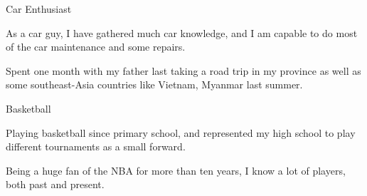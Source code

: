 
\begin{cventries}
  \cventry
    {} %
    {Car Enthusiast} %
    {} %
    {} %
    {
      \begin{cvitems} %
        \item {As a car guy, I have gathered much car knowledge, and I am capable to do most of the car maintenance and some repairs.  }
		\item{Spent one month with my father last taking a road trip in my province as well as some southeast-Asia countries like Vietnam, Myanmar last summer.}
      \end{cvitems}
    }
    
    \cventry
    {} %
    {Basketball} %
    {} %
    {} %
    {
      \begin{cvitems} %
        \item {Playing basketball since primary school, and represented my high school to play different tournaments as a small forward. }
		\item {Being a huge fan of the NBA for more than ten years, I know a lot of players, both past and present. }
      \end{cvitems}
    }
    
    
\end{cventries}